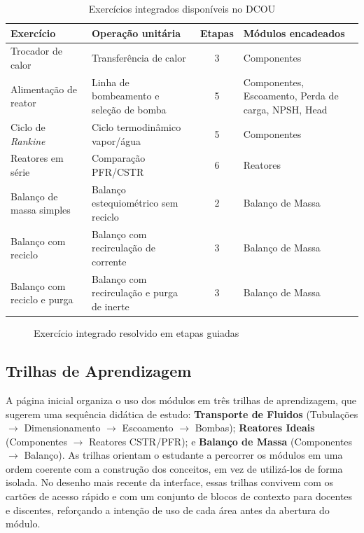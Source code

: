 \begin{table}[H]
\centering
\caption{Exercícios integrados disponíveis no DCOU}
\label{tab:exercicios}
\begin{tabular}{|>{\raggedright\arraybackslash}p{}|>{\raggedright\arraybackslash}p{}|c|>{\raggedright\arraybackslash}p{}|}
\hline
\textbf{Exercício} & \textbf{Operação unitária} & \textbf{Etapas} & \textbf{Módulos encadeados} \\ \hline
Trocador de calor & Transferência de calor & 3 & Componentes \\ \hline
Alimentação de reator & Linha de bombeamento e seleção de bomba & 5 & Componentes, Escoamento, Perda de carga, NPSH, Head \\ \hline
Ciclo de \textit{Rankine} & Ciclo termodinâmico vapor/água & 5 & Componentes \\ \hline
Reatores em série & Comparação PFR/CSTR & 6 & Reatores \\ \hline
Balanço de massa simples & Balanço estequiométrico sem reciclo & 2 & Balanço de Massa \\ \hline
Balanço com reciclo & Balanço com recirculação de corrente & 3 & Balanço de Massa \\ \hline
Balanço com reciclo e purga & Balanço com recirculação e purga de inerte & 3 & Balanço de Massa \\ \hline
\end{tabular}
\end{table}

\begin{figure}[H]
    \centering
    \caption{Exercício integrado resolvido em etapas guiadas}
    \label{fig:exercicio_integrado}
\end{figure}

\subsection{Trilhas de Aprendizagem}

A página inicial organiza o uso dos módulos em três trilhas de aprendizagem, que sugerem uma sequência didática de estudo: \textbf{Transporte de Fluidos} (Tubulações $\rightarrow$ Dimensionamento $\rightarrow$ Escoamento $\rightarrow$ Bombas); \textbf{Reatores Ideais} (Componentes $\rightarrow$ Reatores CSTR/PFR); e \textbf{Balanço de Massa} (Componentes $\rightarrow$ Balanço). As trilhas orientam o estudante a percorrer os módulos em uma ordem coerente com a construção dos conceitos, em vez de utilizá-los de forma isolada. No desenho mais recente da interface, essas trilhas convivem com os cartões de acesso rápido e com um conjunto de blocos de contexto para docentes e discentes, reforçando a intenção de uso de cada área antes da abertura do módulo.

